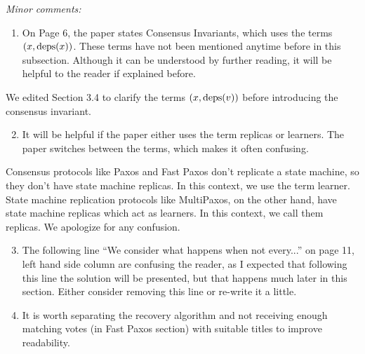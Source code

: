 \documentclass[letterpaper,twocolumn,10pt]{article}
\newenvironment{reviewerquote}
{\list{}{\leftmargin=\parindent\rightmargin=0in}\item[] \itshape \color{ReviewerDarkGray}}%
{\endlist}
\begin{document}
\begin{reviewerquote}
  Minor comments:

  \begin{enumerate}
    \setcounter{enumi}{0}
    \item
      On Page 6, the paper states Consensus Invariants, which uses the terms
      $(x, \text{deps}(x))$. These terms have not been mentioned anytime before in
      this subsection. Although it can be understood by further reading, it
      will be helpful to the reader if explained before.
  \end{enumerate}
\end{reviewerquote}

We edited Section 3.4 to clarify the terms $(x, \text{deps}(v))$ before introducing
the consensus invariant.

\begin{reviewerquote}
  \begin{enumerate}
    \setcounter{enumi}{1}
    \item
      It will be helpful if the paper either uses the term replicas or learners.
      The paper switches between the terms, which makes it often confusing.
  \end{enumerate}
\end{reviewerquote}

Consensus protocols like Paxos and Fast Paxos don't replicate a state machine,
so they don't have state machine replicas. In this context, we use the term
learner. State machine replication protocols like MultiPaxos, on the other
hand, have state machine replicas which act as learners. In this context, we
call them replicas. We apologize for any confusion.

\begin{reviewerquote}
  \begin{enumerate}
    \setcounter{enumi}{2}
    \item
      The following line ``We consider what happens when not every...'' on page
      11, left hand side column are confusing the reader, as I expected that
      following this line the solution will be presented, but that happens much
      later in this section. Either consider removing this line or re-write it a
      little.
    \item
      It is worth separating the recovery algorithm and not receiving enough
      matching votes (in Fast Paxos section) with suitable titles to improve
      readability.
  \end{enumerate}
\end{reviewerquote}
\end{document}
